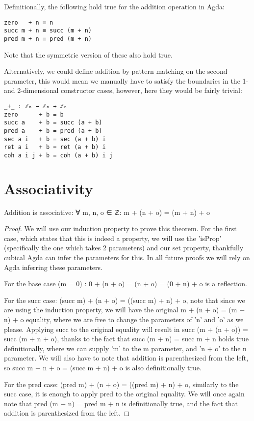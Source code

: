 Definitionally, the following hold true for the addition operation in Agda:
\begin{verbatim}
zero   + n ≡ n
succ m + n ≡ succ (m + n)
pred m + n ≡ pred (m + n)
\end{verbatim}
Note that the symmetric version of these also hold true.

Alternatively, we could define addition by pattern matching on the second parameter, this would mean we manually have to satisfy the boundaries in the 1- and 2-dimensional constructor cases, however, here they would be fairly trivial:
\begin{verbatim}
_+_ : ℤₕ → ℤₕ → ℤₕ
zero      + b = b
succ a    + b = succ (a + b)
pred a    + b = pred (a + b)
sec a i   + b = sec (a + b) i
ret a i   + b = ret (a + b) i
coh a i j + b = coh (a + b) i j
\end{verbatim}

\section{Associativity}
\begin{theorem}
  Addition is associative: ∀ m, n, o ∈ ℤ: m + (n + o) = (m + n) + o
\end{theorem}

\begin{proof}
  We will use our induction property to prove this theorem. For the first case, which states that this is indeed a property, we will use the 'isProp' (specifically the one which takes 2 parameters) and our set property, thankfully cubical Agda can infer the parameters for this. In all future proofs we will rely on Agda inferring these parameters.

  For the base case (m = 0) : 0 + (n + o) = (n + o) = (0 + n) + o is a reflection.

  For the succ case: (succ m) + (n + o) = ((succ m) + n) + o, note that since we are using the induction property, we will have the original m + (n + o) = (m + n) + o equality, where we are free to change the parameters of 'n' and 'o' as we please. Applying succ to the original equality will result in succ (m + (n + o)) = succ (m + n + o), thanks to the fact that succ (m + n) = succ m + n holds true definitionally, where we can supply 'm' to the m parameter, and 'n + o' to the n parameter. We will also have to note that addition is parenthesized from the left, so succ m + n + o = (succ m + n) + o is also definitionally true.

  For the pred case: (pred m) + (n + o) = ((pred m) + n) + o, similarly to the succ case, it is enough to apply pred to the original equality. We will once again note that pred (m + n) = pred m + n is definitionally true, and the fact that addition is parenthesized from the left.
\end{proof}

